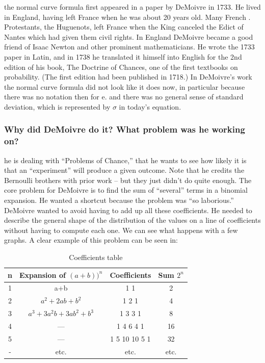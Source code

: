 \documentclass{article}
\begin{document}
the normal curve formula first appeared in a paper by DeMoivre in 1733. He lived in
England, having left France when he was about 20 years old. Many French .
Protestants, the Huguenots, left France when the King canceled the Edict of Nantes
which had given them civil rights. In England DeMoivre became a good friend of
Isaac Newton and other prominent mathematicians.
He wrote the 1733 paper in Latin, and in 1738 he translated it himself into English for
the 2nd edition of his book, The Doctrine of Chances, one of the first textbooks on
probability. (The first edition had been published in 1718.)
In DeMoivre’s work the normal curve formula did not look like it does now, in particular because there
was no notation then for e. and there was no general sense of standard deviation, which is represented by $ \sigma $ in today’s equation.
\subsubsection{Why did DeMoivre do it? What problem was he working on?}
he is dealing with
“Problems of Chance,” that he wants
to see how likely it is that an
“experiment” will produce a given
outcome. Note that he credits the
Bernoulli brothers with prior work –
but they just didn’t do quite enough.
The core problem for DeMoivre is to
find the sum of “several” terms in a
binomial expansion. He wanted a
shortcut because the problem was “so
laborious.”
DeMoivre wanted to avoid having to add up all these coefficients. He needed to describe the general
shape of the distribution of the values on a line of coefficients without having to compute each one. We can see what happens with a few graphs.
A clear example of this problem can be seen in:
\begin{table}[H]
\centering
\begin{tabular}{c|c|c|c}
    n &  Expansion of $ (a+b))^n $ & Coefficients & Sum $ 2^{n} $ \\\hline

    1 &  a+b& 1 1 & 2                                \\
    2 & $ a^2 +2ab+b^2 $ & 1 2 1 & 4                     \\
    3 & $ a^3+3a^{2}b+3ab^2+b^3 $ & 1 3 3 1 & 8                \\
    4 & ---   & 1 4 6 4 1 & 16                         \\
    5 & ---   & 1 5 10 10 5 1 & 32                     \\
    - & etc. & etc. & etc.                         \\

\end{tabular}
\caption{\label{tab:widgets}Coefficients table}
\end{table}
\end{document}
